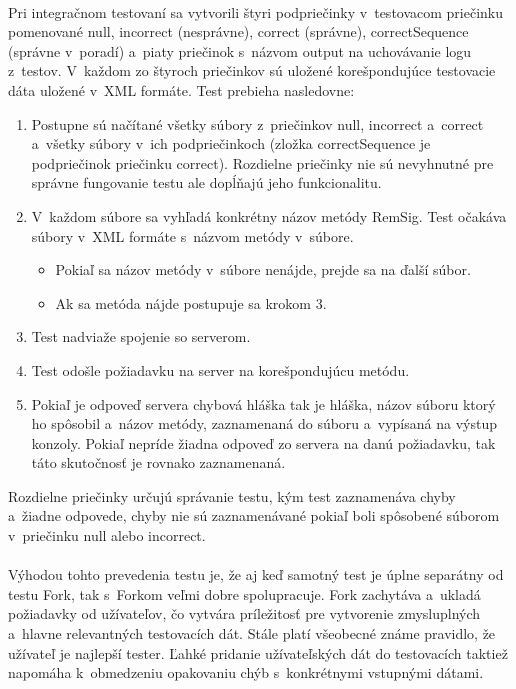 \documentclass[
  printed, %
  table,   %
oneside,
  nolof,     %
  nolot,     %
]{fithesis3}
\begin{document}
 \paragraph{}
Pri integračnom testovaní sa  vytvorili štyri podpriečinky  v~testovacom priečinku pomenované null, incorrect (nesprávne), correct (správne), correctSequence (správne v~poradí) a~piaty priečinok s~názvom output na uchovávanie logu z~testov. V~každom zo štyroch priečinkov sú uložené korešpondujúce testovacie dáta uložené v~XML formáte. Test prebieha nasledovne: 
\begin{enumerate}
	\item Postupne sú načítané všetky súbory z~priečinkov null, incorrect a~correct a~všetky súbory v~ich podpriečinkoch (zložka correctSequence je podpriečinok priečinku correct). Rozdielne priečinky nie sú nevyhnutné pre správne fungovanie testu ale dopĺňajú jeho funkcionalitu. 
	\item V~každom súbore sa vyhľadá konkrétny názov metódy RemSig. Test očakáva súbory v~XML formáte s~názvom metódy v~súbore.
	\begin{itemize}
		\item Pokiaľ sa názov metódy v~súbore nenájde, prejde sa na ďalší súbor.
		\item Ak sa metóda nájde postupuje sa krokom 3.
	\end{itemize}
	\item Test nadviaže spojenie so serverom.
	\item Test odošle požiadavku na server na korešpondujúcu metódu.
	\item Pokiaľ je odpoveď servera chybová hláška  tak je hláška, názov súboru ktorý ho spôsobil a~názov metódy, zaznamenaná do súboru a~vypísaná na výstup konzoly. Pokiaľ nepríde žiadna odpoveď zo servera na danú požiadavku, tak táto skutočnosť je rovnako zaznamenaná.  

\end{enumerate}
Rozdielne priečinky určujú správanie testu, kým test zaznamenáva chyby a~žiadne odpovede, chyby nie sú zaznamenávané pokiaľ boli spôsobené súborom v~priečinku null alebo incorrect.
\paragraph{}
Výhodou tohto prevedenia testu je, že aj keď samotný test je úplne separátny od testu Fork, tak s~Forkom veľmi dobre spolupracuje. Fork zachytáva a~ukladá požiadavky od užívateľov, čo vytvára príležitosť pre vytvorenie zmysluplných a~hlavne relevantných testovacích dát. Stále platí všeobecné známe pravidlo, že užívateľ je najlepší tester. Ľahké pridanie užívateľských dát do testovacích taktiež napomáha k~obmedzeniu opakovaniu chýb s~konkrétnymi vstupnými dátami.      
\end{document}

